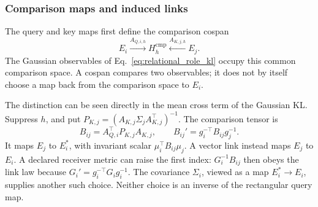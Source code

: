 \documentclass[twoside,11pt]{article}
\begin{document}
\subsubsection{Comparison maps and induced links}

The query and key maps first define the comparison cospan
\begin{equation}
E_i\xrightarrow{A_{Q,i,h}}H_h^{\mathrm{cmp}}
\xleftarrow{A_{K,j,h}}E_j.
\label{eq:comparison_cospan}
\end{equation}
The Gaussian observables of Eq.~\eqref{eq:relational_role_kl} occupy this common comparison space. A cospan compares two observables; it does not by itself choose a map back from the comparison space to $E_i$.

The distinction can be seen directly in the mean cross term of the Gaussian KL. Suppress $h$, and put $P_{K,j}=(A_{K,j}\Sigma_jA_{K,j}^\top)^{-1}$. The comparison tensor is
\begin{equation}
B_{ij}=A_{Q,i}^\top P_{K,j}A_{K,j},\qquad
B_{ij}'=g_i^{-\top}B_{ij}g_j^{-1}.
\label{eq:comparison_bilinear_tensor}
\end{equation}
It maps $E_j$ to $E_i^*$, with invariant scalar $\mu_i^\top B_{ij}\mu_j$. A vector link instead maps $E_j$ to $E_i$. A declared receiver metric can raise the first index: $G_i^{-1}B_{ij}$ then obeys the link law because $G_i'=g_i^{-\top}G_ig_i^{-1}$. The covariance $\Sigma_i$, viewed as a map $E_i^*\to E_i$, supplies another such choice. Neither choice is an inverse of the rectangular query map.
\end{document}
